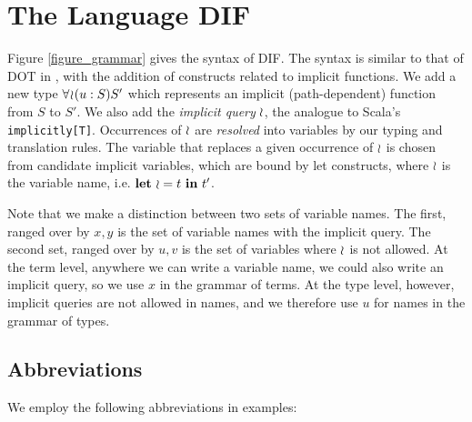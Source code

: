 \section{The Language DIF}
Figure \ref{figure_grammar} gives the syntax of DIF. The syntax is similar to
that of DOT in \cite{AGORS16}, with the addition of constructs related to
implicit functions. We add a new type $\forall\!\wr\!(u:S)S'$ which represents an
implicit (path-dependent) function from $S$ to $S'$. We also add the
\emph{implicit query} $\wr$, the analogue to Scala's \texttt{implicitly[T]}.
Occurrences of $\wr$ are \emph{resolved} into variables by our typing and
translation rules. The variable that replaces a given occurrence of $\wr$ is
chosen from candidate implicit variables, which are bound by let constructs,
where $\wr$ is the variable name, i.e. $\textbf{let}\ \wr = t\ \textbf{in}\ t'$.

Note that we make a distinction between two sets of variable names. The first,
ranged over by $x, y$ is the set of variable names with the implicit query. The
second set, ranged over by $u, v$ is the set of variables where $\wr$ is not
allowed. At the term level, anywhere we can write a variable name, we could
also write an implicit query, so we use $x$ in the grammar of terms. At the
type level, however, implicit queries are not allowed in names, and we
therefore use $u$ for names in the grammar of types.

\begin{figure*}[h]
    
    \caption{Grammar of DIF}
    \label{figure_grammar}
\end{figure*}

\subsection{Abbreviations}
We employ the following abbreviations in examples:

